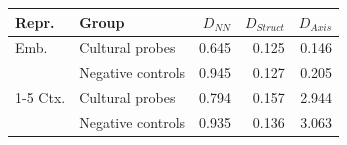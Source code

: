 \begin{tabular}{@{}llrrr@{}}
\toprule
Repr. & Group & $D_{NN}$ & $D_{Struct}$ & $D_{Axis}$ \\
\midrule
Emb. & Cultural probes & 0.645 & 0.125 & 0.146 \\
 & Negative controls & 0.945 & 0.127 & 0.205 \\
\cmidrule(lr){1-5}
Ctx. & Cultural probes & 0.794 & 0.157 & 2.944 \\
 & Negative controls & 0.935 & 0.136 & 3.063 \\
\bottomrule
\end{tabular}
